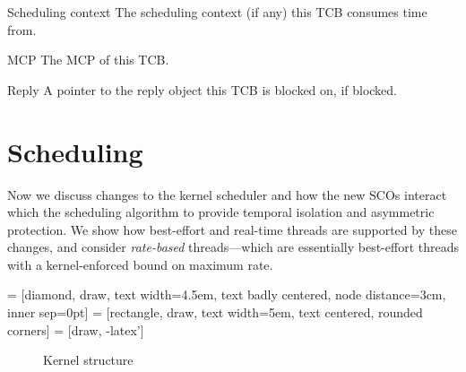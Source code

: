 \begin{description}
    \item{Scheduling context} The scheduling context (if any) this \gls{TCB} consumes time from. 
    \item{\gls{MCP}} The \gls{MCP} of this \gls{TCB}.
    \item{Reply} A pointer to the reply object this TCB is blocked on, if blocked.
  
\end{description}





\section{Scheduling}

Now we discuss changes to the kernel scheduler and how the new \glspl{SCO} interact which the
scheduling algorithm to provide temporal isolation and asymmetric protection.
We show how best-effort and real-time threads are supported by these changes, and consider \emph{rate-based} threads---which are essentially best-effort threads with a kernel-enforced bound on maximum rate.


 = [diamond, draw,
    text width=4.5em, text badly centered, node distance=3cm, inner sep=0pt]
 = [rectangle, draw,
    text width=5em, text centered, rounded corners]
 = [draw, -latex']


\begin{figure}
\caption{Kernel structure}
\label{figure:tickless}
\end{figure}

